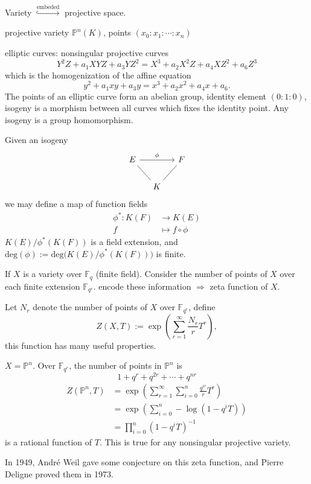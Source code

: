 Variety $\overset{\text{embeded}}{\hookrightarrow}$ projective space.

projective variety $\mathbb{P}^n(K)$, points $(x_0:x_1: \cdots : x_n)$

elliptic curves: nonsingular projective curves
\[Y^2Z+a_1XYZ+a_3YZ^2=X^3+a_2X^2Z+a_4XZ^2+a_6Z^3\]
which is the homogenization of the affine equation
\[y^2+a_1xy+a_3y=x^3+a_2x^2+a_4x+a_6.\]
The points of an elliptic curve form an abelian group, identity element $(0:1:0)$, isogeny is a morphism between all curves which fixes the identity point. Any isogeny is a group homomorphism.

Given an isogeny 
\[
\begin{tikzcd}[column sep=small]
E \arrow[rr,"\phi"] \arrow[dash,rd] & & F \arrow[dash,ld]\\
& K   & 
\end{tikzcd}
\]
we may define a map of function fields
\begin{align*}
\phi^* \colon K(F)& \longrightarrow K(E) \\
f& \mapsto f\circ \phi
\end{align*}
$K(E)/\phi^*(K(F))$ is a field extension, and $\mathrm{deg}(\phi):=\mathrm{deg}\big(K(E)/\phi^*(K(F))\big)$ is finite.

If $X$ is a variety over $\mathbb{F}_q$ (finite field). Consider the number of points of $X$ over each finite extension $\mathbb{F}_{q^r}$. encode these information $\Longrightarrow$ zeta function of $X$. 

Let $N_r$ denote the number of points of $X$ over $\mathbb{F}_{q^r}$, define
\[Z(X,T):=\exp(\sum_{r=1}^{\infty}\frac{N_r}{r}T^r),\]
this function has many useful properties.
\begin{example}
	$X=\mathbb{P}^n$. Over $\mathbb{F}_{q^r}$, the number of points in $\mathbb{P}^n$ is
	\[1+q^r+q^{2r}+\cdots+q^{nr}\]
	\begin{align*}
	Z(\mathbb{P}^n,T)&=\exp (\sum_{r=1}^{\infty}\sum_{i=0}^n\frac{q^{ir}}{r}T^r)\\
	&=\exp (\sum_{i=0}^n-\log(1-q^iT))\\
	&=\prod_{i=0}^n (1-q^iT)^{-1}
	\end{align*}
	is a rational function of $T$. This is true for any nonsingular projective variety.
\end{example}

In 1949, Andr\'{e} Weil gave some conjecture on this zeta function, and Pierre Deligne proved them in 1973.

